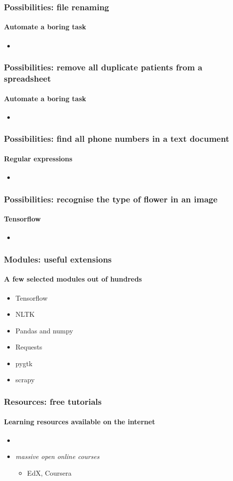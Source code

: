 \documentclass{beamer}
\begin{document}
    \begin{frame}
	    \frametitle{Possibilities: file renaming}
	    \framesubtitle{Automate a boring task}
	    \begin{itemize}
		    \item 
	    \end{itemize}
    \end{frame}

    \begin{frame}
	    \frametitle{Possibilities: remove all duplicate patients from a spreadsheet}
	    \framesubtitle{Automate a boring task}
	    \begin{itemize}
		    \item 
	    \end{itemize}
    \end{frame}

    \begin{frame}
	    \frametitle{Possibilities: find all phone numbers in a text document}
	    \framesubtitle{Regular expressions}
	    \begin{itemize}
		    \item 
	    \end{itemize}
    \end{frame}


    \begin{frame}
	    \frametitle{Possibilities: recognise the type of flower in an image}
	    \framesubtitle{Tensorflow}
	    \begin{itemize}
		    \item 
	    \end{itemize}
    \end{frame}

    \begin{frame}
	    \frametitle{Modules: useful extensions}
	    \framesubtitle{A few selected modules out of hundreds}
	    \begin{itemize}
		    \item Tensorflow
		    \item NLTK
		    \item Pandas and numpy
		    \item Requests
		    \item pygtk
		    \item scrapy
	    \end{itemize}
    \end{frame}



    \begin{frame}
	    \frametitle{Resources: free tutorials}
	    \framesubtitle{Learning resources available on the internet}
	    \begin{itemize}
		    \item 
		    \item \textit{massive open online courses}
			    \begin{itemize}
				    \item EdX, Coursera
			    \end{itemize}
	    \end{itemize}
    \end{frame}
\end{document}
